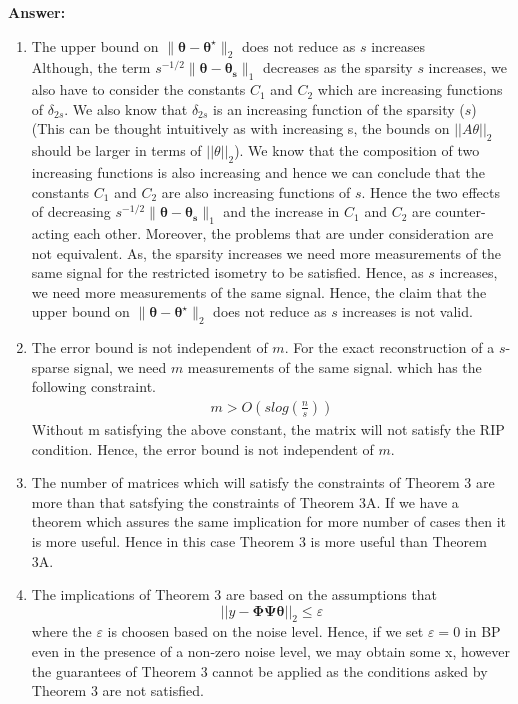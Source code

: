 \documentclass[12pt]{article}
\begin{document}
\textbf{Answer:} \\
\begin{enumerate}
    \item The upper bound on $\| \boldsymbol{\theta} - \boldsymbol{\theta^{\star}} \|_2$ does not reduce as $s$ increases \\
    Although, the term $s^{-1/2}  \|\boldsymbol{\theta}-\boldsymbol{\theta_s}\|_1$ decreases as the sparsity $s$ increases, we also have to consider the constants $C_1$ and $C_2$ which are increasing functions of $\delta_{2s}$. We also know that $\delta_{2s}$ is an increasing function of the sparsity ($s$) (This can be thought intuitively as with increasing s, the bounds on $ ||A \theta ||_2 $ should be larger in terms of $ ||\theta||_2 $). We know that the composition of two increasing functions is also increasing and hence we can conclude that the constants $C_1$ and $C_2$ are also increasing functions of $s$. Hence the two effects of decreasing $s^{-1/2}  \|\boldsymbol{\theta}-\boldsymbol{\theta_s}\|_1$ and the increase in $C_1$ and $C_2$ are counter-acting each other. Moreover, the problems that are under consideration are not equivalent. As, the sparsity increases we need more measurements of the same signal for the restricted isometry to be satisfied. Hence, as $s$ increases, we need more measurements of the same signal. Hence, the claim that the upper bound on $\|\boldsymbol{\theta} - \boldsymbol{\theta^{\star}}\|_2$ does not reduce as $s$ increases is not valid. \\

    \item The error bound is not independent of $m$. For the exact reconstruction of a $s$-sparse signal, we need $m$ measurements of the same signal. which has the following constraint.  
    \begin{gather*}
        m > O (s log(\frac{n}{s}) )
    \end{gather*} 
    Without m satisfying the above constant, the matrix will not satisfy the RIP condition. Hence, the error bound is not independent of $m$. \\

    \item The number of matrices which will satisfy the constraints of Theorem 3 are more than that satsfying the constraints of Theorem 3A. If we have a theorem which assures the same implication for more number of cases then it is more useful. Hence in this case Theorem 3 is more useful than Theorem 3A. \\ 
    
    \item The implications of Theorem 3 are based on the assumptions that $$ || y - \boldsymbol{\Phi \Psi \theta} ||_2 \leq \varepsilon $$  
    where the $\varepsilon$ is choosen based on the noise level. Hence, if we set $\varepsilon = 0$ in BP even in the presence of a non-zero noise level, we may obtain some x, however the guarantees of Theorem 3 cannot be applied as the conditions asked by Theorem 3 are not satisfied. \\
    
\end{enumerate}
\end{document}
